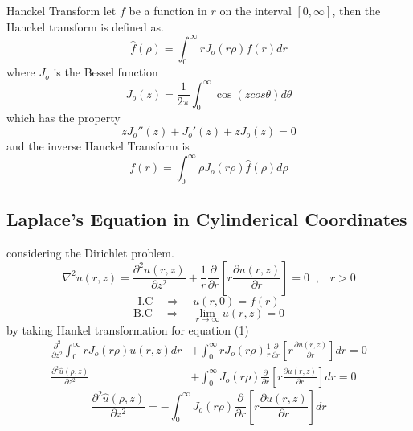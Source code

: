 \documentclass[]{article}
\begin{document}
\begin{enrichment*}{Hanckel Transform}
    let $f$ be a function in $r$ on the interval $[0,\infty]$, then the Hanckel transform is defined as.
    \[
        \hat{f}(\rho) = \int_{0}^{\infty} r J_o(r\rho) f(r) dr    
    \]
    where $J_o$ is the Bessel function 
    \[
        J_o(z) = \frac{1}{2\pi}\int_{0}^{\infty} \cos(zcos\theta)d\theta     
    \]
    which has the property 
    \[
        z J_o''(z) + J_o'(z)+ zJ_o(z) = 0     
    \]
    and the inverse Hanckel Transform is 
    \[
        f(r) = \int_{0}^{\infty} \rho J_o(r\rho) \hat{f}(\rho) d\rho    
    \]
\end{enrichment*}
\setcounter{equation}{0}
\subsection{Laplace's Equation in Cylinderical Coordinates}
considering the Dirichlet problem.
\begin{equation}
\nabla^2 u(r,z) = \frac{\partial^2 u(r,z)}{\partial z^2} + \frac{1}{r}\frac{\partial}{\partial r}\left[r\frac{\partial u(r,z)}{\partial r}\right] = 0 \;\; , \;\;\; r >0
\end{equation}
\begin{equation}
\text{I.C} \quad \Longrightarrow \quad u(r,0) = f(r)
\end{equation}
\begin{equation}
\text{B.C} \quad \Longrightarrow \quad \lim_{r\rightarrow\infty} u(r,z) =0
\end{equation}
by taking Hankel transformation for equation (1) 
\begin{align*}
\frac{\partial^2 }{\partial z^2}\int_{0}^{\infty} rJ_o(r\rho)u(r,z) dr &+ \int_{0}^{\infty}rJ_o(r\rho)\frac{1}{r}\frac{\partial}{\partial r}\left[r\frac{\partial u(r,z)}{\partial r}\right]dr = 0
\\
\frac{\partial^2 \hat{u}(\rho,z)}{\partial z^2} &+ \int_{0}^{\infty}J_o(r\rho)\frac{\partial}{\partial r}\left[r\frac{\partial u(r,z)}{\partial r}\right]dr = 0
\end{align*}
\begin{equation}
\frac{\partial^2 \hat{u}(\rho,z)}{\partial z^2}  = -\int_{0}^{\infty}J_o(r\rho)\frac{\partial}{\partial r}\left[r\frac{\partial u(r,z)}{\partial r}\right]dr
\end{equation}

\newpage 
\end{document}
